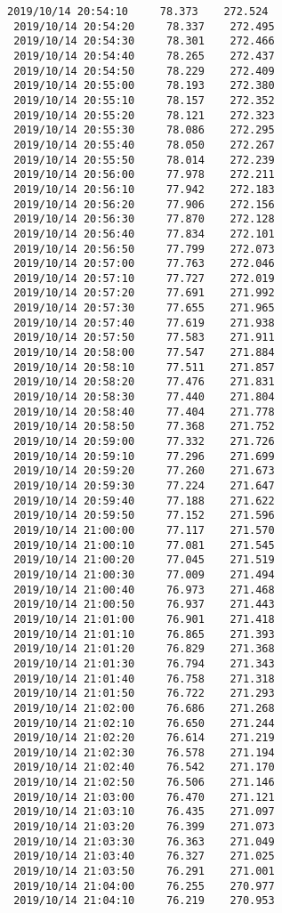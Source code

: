 \documentclass[11pt]{article}
\begin{document}
\begin{Verbatim}[commandchars=\\\{\}]
 2019/10/14 20:54:10     78.373    272.524
 2019/10/14 20:54:20     78.337    272.495
 2019/10/14 20:54:30     78.301    272.466
 2019/10/14 20:54:40     78.265    272.437
 2019/10/14 20:54:50     78.229    272.409
 2019/10/14 20:55:00     78.193    272.380
 2019/10/14 20:55:10     78.157    272.352
 2019/10/14 20:55:20     78.121    272.323
 2019/10/14 20:55:30     78.086    272.295
 2019/10/14 20:55:40     78.050    272.267
 2019/10/14 20:55:50     78.014    272.239
 2019/10/14 20:56:00     77.978    272.211
 2019/10/14 20:56:10     77.942    272.183
 2019/10/14 20:56:20     77.906    272.156
 2019/10/14 20:56:30     77.870    272.128
 2019/10/14 20:56:40     77.834    272.101
 2019/10/14 20:56:50     77.799    272.073
 2019/10/14 20:57:00     77.763    272.046
 2019/10/14 20:57:10     77.727    272.019
 2019/10/14 20:57:20     77.691    271.992
 2019/10/14 20:57:30     77.655    271.965
 2019/10/14 20:57:40     77.619    271.938
 2019/10/14 20:57:50     77.583    271.911
 2019/10/14 20:58:00     77.547    271.884
 2019/10/14 20:58:10     77.511    271.857
 2019/10/14 20:58:20     77.476    271.831
 2019/10/14 20:58:30     77.440    271.804
 2019/10/14 20:58:40     77.404    271.778
 2019/10/14 20:58:50     77.368    271.752
 2019/10/14 20:59:00     77.332    271.726
 2019/10/14 20:59:10     77.296    271.699
 2019/10/14 20:59:20     77.260    271.673
 2019/10/14 20:59:30     77.224    271.647
 2019/10/14 20:59:40     77.188    271.622
 2019/10/14 20:59:50     77.152    271.596
 2019/10/14 21:00:00     77.117    271.570
 2019/10/14 21:00:10     77.081    271.545
 2019/10/14 21:00:20     77.045    271.519
 2019/10/14 21:00:30     77.009    271.494
 2019/10/14 21:00:40     76.973    271.468
 2019/10/14 21:00:50     76.937    271.443
 2019/10/14 21:01:00     76.901    271.418
 2019/10/14 21:01:10     76.865    271.393
 2019/10/14 21:01:20     76.829    271.368
 2019/10/14 21:01:30     76.794    271.343
 2019/10/14 21:01:40     76.758    271.318
 2019/10/14 21:01:50     76.722    271.293
 2019/10/14 21:02:00     76.686    271.268
 2019/10/14 21:02:10     76.650    271.244
 2019/10/14 21:02:20     76.614    271.219
 2019/10/14 21:02:30     76.578    271.194
 2019/10/14 21:02:40     76.542    271.170
 2019/10/14 21:02:50     76.506    271.146
 2019/10/14 21:03:00     76.470    271.121
 2019/10/14 21:03:10     76.435    271.097
 2019/10/14 21:03:20     76.399    271.073
 2019/10/14 21:03:30     76.363    271.049
 2019/10/14 21:03:40     76.327    271.025
 2019/10/14 21:03:50     76.291    271.001
 2019/10/14 21:04:00     76.255    270.977
 2019/10/14 21:04:10     76.219    270.953

\end{Verbatim}
\end{document}

